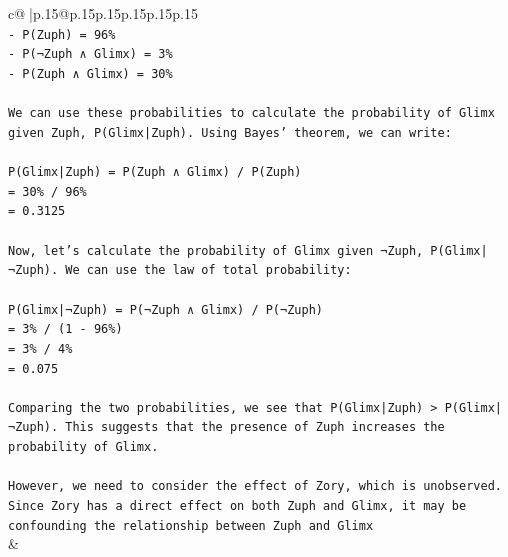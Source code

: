 \documentclass{article}
\begin{document}
{\begin{supertabular}{c@{$\;$}|p{.15\linewidth}@{}p{.15\linewidth}p{.15\linewidth}p{.15\linewidth}p{.15\linewidth}p{.15\linewidth}}
{{{\\ 
\texttt{{-} P(Zuph) = 96\%} \\
\texttt{{-} P(¬Zuph ∧ Glimx) = 3\%} \\
\texttt{{-} P(Zuph ∧ Glimx) = 30\%} \\
\\ 
\texttt{We can use these probabilities to calculate the probability of Glimx given Zuph, P(Glimx|Zuph). Using Bayes' theorem, we can write:} \\
\\ 
\texttt{P(Glimx|Zuph) = P(Zuph ∧ Glimx) / P(Zuph)} \\
\texttt{= 30\% / 96\%} \\
\texttt{= 0.3125} \\
\\ 
\texttt{Now, let's calculate the probability of Glimx given ¬Zuph, P(Glimx|¬Zuph). We can use the law of total probability:} \\
\\ 
\texttt{P(Glimx|¬Zuph) = P(¬Zuph ∧ Glimx) / P(¬Zuph)} \\
\texttt{= 3\% / (1 {-} 96\%)} \\
\texttt{= 3\% / 4\%} \\
\texttt{= 0.075} \\
\\ 
\texttt{Comparing the two probabilities, we see that P(Glimx|Zuph) > P(Glimx|¬Zuph). This suggests that the presence of Zuph increases the probability of Glimx.} \\
\\ 
\texttt{However, we need to consider the effect of Zory, which is unobserved. Since Zory has a direct effect on both Zuph and Glimx, it may be confounding the relationship between Zuph and Glimx} \\
            }
        }
    }
    & \\ \\


\end{supertabular}}
\end{document}
